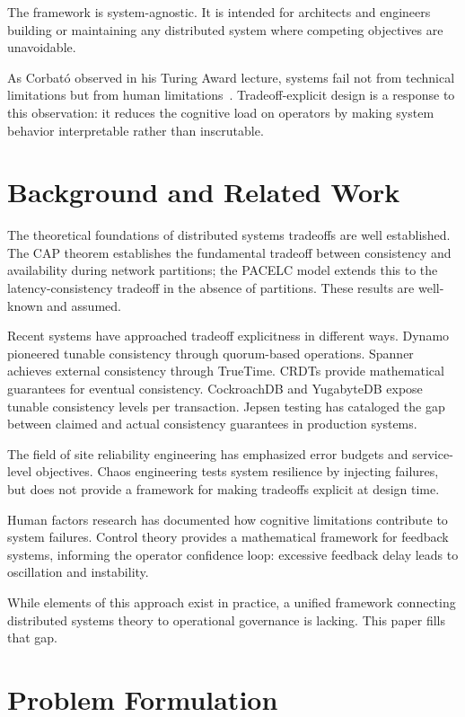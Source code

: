 \documentclass[conference]{IEEEtran}
\begin{document}
The framework is system-agnostic. It is intended for architects and engineers building or maintaining any distributed system where competing objectives are unavoidable.

As Corbat\'o observed in his Turing Award lecture, systems fail not from technical limitations but from human limitations~\cite{corbato1972}. Tradeoff-explicit design is a response to this observation: it reduces the cognitive load on operators by making system behavior interpretable rather than inscrutable.

\section{Background and Related Work}

The theoretical foundations of distributed systems tradeoffs are well established. The CAP theorem establishes the fundamental tradeoff between consistency and availability during network partitions; the PACELC model extends this to the latency-consistency tradeoff in the absence of partitions. These results are well-known and assumed.

Recent systems have approached tradeoff explicitness in different ways. Dynamo pioneered tunable consistency through quorum-based operations. Spanner achieves external consistency through TrueTime. CRDTs provide mathematical guarantees for eventual consistency. CockroachDB and YugabyteDB expose tunable consistency levels per transaction. Jepsen testing has cataloged the gap between claimed and actual consistency guarantees in production systems.

The field of site reliability engineering has emphasized error budgets and service-level objectives. Chaos engineering tests system resilience by injecting failures, but does not provide a framework for making tradeoffs explicit at design time.

Human factors research has documented how cognitive limitations contribute to system failures. Control theory provides a mathematical framework for feedback systems, informing the operator confidence loop: excessive feedback delay leads to oscillation and instability.

While elements of this approach exist in practice, a unified framework connecting distributed systems theory to operational governance is lacking. This paper fills that gap.

\section{Problem Formulation}
\end{document}
